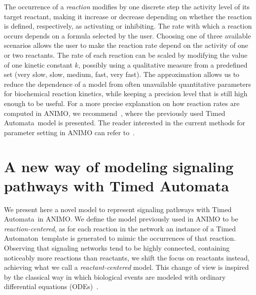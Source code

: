 \documentclass{llncs}
\newcommand{\ta}{Timed Automaton}
\newcommand{\tas}{Timed Automata}
\begin{document}
The occurrence of a \emph{reaction} modifies by one discrete step the activity level of its target reactant, making it increase or decrease 
depending on whether the reaction is defined, respectively, as activating or inhibiting.
The rate with which a reaction occurs depends on a formula selected by the user. 
Choosing one of three available scenarios allows the user to make the reaction rate depend on
the activity of one or two reactants.
The rate of each reaction can be scaled by modifying the value of one kinetic constant $k$,
possibly using a qualitative measure from a predefined set ({\sf very slow}, {\sf slow},
{\sf medium}, {\sf fast}, {\sf very fast}).
The approximation allows us to reduce the dependence of a model from often unavailable quantitative
parameters for biochemical reaction kinetics, while keeping a precision level that is still high enough to be useful.
For a more precise explanation on how reaction rates are computed in ANIMO, we recommend~\cite{animo-ieee},
where the previously used \tas\ model is presented. The reader interested in the current
methods for parameter setting in ANIMO can refer to~\cite{animo-syncop}.




\section{A new way of modeling signaling pathways with \tas}\label{sec:animo-new}
We present here a novel model to represent signaling pathways with \tas\ in ANIMO.
We define the model previously used in ANIMO to be \emph{reaction-centered}, as for each reaction
in the network an instance of a \ta\ template is generated to mimic
the occurrences of that reaction. Observing that signaling
networks tend to be highly connected, containing noticeably more reactions than reactants,
we shift the focus on reactants instead, achieving what we call a \emph{reactant-centered} model.
This change of view is inspired by the classical way in which biological events are modeled
with ordinary differential equations (ODEs)~\cite{ode-ma-anche-altro}.

\end{document}
